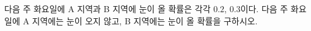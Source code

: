 다음 주 화요일에 A 지역과 B 지역에 눈이 올 확률은 각각 $0.2$, $0.3$이다. 다음 주 화요일에 A 지역에는 눈이 오지 않고, B 지역에는 눈이 올 확률을 구하시오. 
